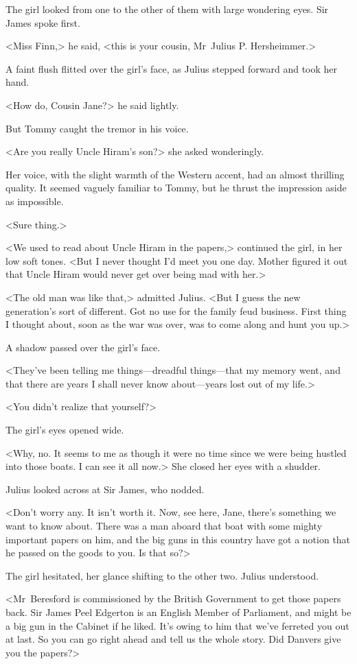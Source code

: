 The girl looked from one to the other of them with large wondering eyes. Sir James spoke first.

<Miss Finn,> he said, <this is your cousin, Mr~Julius P. Hersheimmer.>

A faint flush flitted over the girl's face, as Julius stepped forward and took her hand.

<How do, Cousin Jane?> he said lightly.

But Tommy caught the tremor in his voice.

<Are you really Uncle Hiram's son?> she asked wonderingly.

Her voice, with the slight warmth of the Western accent, had an almost thrilling quality. It seemed vaguely familiar to Tommy, but he thrust the impression aside as impossible.

<Sure thing.>

<We used to read about Uncle Hiram in the papers,> continued the girl, in her low soft tones. <But I never thought I'd meet you one day. Mother figured it out that Uncle Hiram would never get over being mad with her.>

<The old man was like that,> admitted Julius. <But I guess the new generation's sort of different. Got no use for the family feud business. First thing I thought about, soon as the war was over, was to come along and hunt you up.>

A shadow passed over the girl's face.

<They've been telling me things—dreadful things—that my memory went, and that there are years I shall never know about—years lost out of my life.>

<You didn't realize that yourself?>

The girl's eyes opened wide.

<Why, no. It seems to me as though it were no time since we were being hustled into those boats. I can see it all now.> She closed her eyes with a shudder.

Julius looked across at Sir James, who nodded.

<Don't worry any. It isn't worth it. Now, see here, Jane, there's something we want to know about. There was a man aboard that boat with some mighty important papers on him, and the big guns in this country have got a notion that he passed on the goods to you. Is that so?>

The girl hesitated, her glance shifting to the other two. Julius understood.

<Mr~Beresford is commissioned by the British Government to get those papers back. Sir James Peel Edgerton is an English Member of Parliament, and might be a big gun in the Cabinet if he liked. It's owing to him that we've ferreted you out at last. So you can go right ahead and tell us the whole story. Did Danvers give you the papers?>

